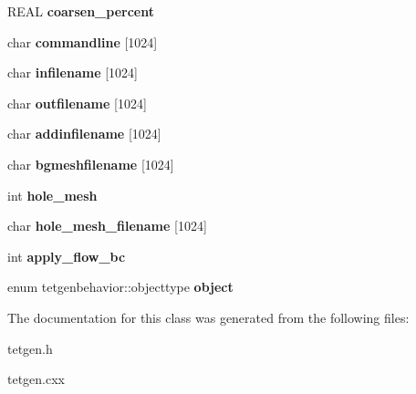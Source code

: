 \begin{DoxyCompactItemize}
R\+E\+AL {\bfseries coarsen\+\_\+percent}
\item 
\mbox{\label{classtetgenbehavior_a56dcfc2ab395c63b7f99d84b2cd1f4e8}} 
char {\bfseries commandline} \mbox{[}1024\mbox{]}
\item 
\mbox{\label{classtetgenbehavior_ac879f6843038d5428199079c515ce6e6}} 
char {\bfseries infilename} \mbox{[}1024\mbox{]}
\item 
\mbox{\label{classtetgenbehavior_aa066e0b8f2b5b3d0f9e5c6b74e8eadc4}} 
char {\bfseries outfilename} \mbox{[}1024\mbox{]}
\item 
\mbox{\label{classtetgenbehavior_a627804470698cc1883fd93999727e334}} 
char {\bfseries addinfilename} \mbox{[}1024\mbox{]}
\item 
\mbox{\label{classtetgenbehavior_ae72a1c6b8d7389d4fad21fa584207aba}} 
char {\bfseries bgmeshfilename} \mbox{[}1024\mbox{]}
\item 
\mbox{\label{classtetgenbehavior_a61cf54aa87af6d95d8085347ef9306c9}} 
int {\bfseries hole\+\_\+mesh}
\item 
\mbox{\label{classtetgenbehavior_acf2a18bc5c07b89594dbefd0c6bcc966}} 
char {\bfseries hole\+\_\+mesh\+\_\+filename} \mbox{[}1024\mbox{]}
\item 
\mbox{\label{classtetgenbehavior_a39a622685e19bb28b6cc621f1f8d2589}} 
int {\bfseries apply\+\_\+flow\+\_\+bc}
\item 
\mbox{\label{classtetgenbehavior_ae01337ff20025a815a4f2e4d8c3d2871}} 
enum tetgenbehavior\+::objecttype {\bfseries object}
\end{DoxyCompactItemize}


The documentation for this class was generated from the following files\+:\begin{DoxyCompactItemize}
\item 
tetgen.\+h\item 
tetgen.\+cxx\end{DoxyCompactItemize}
